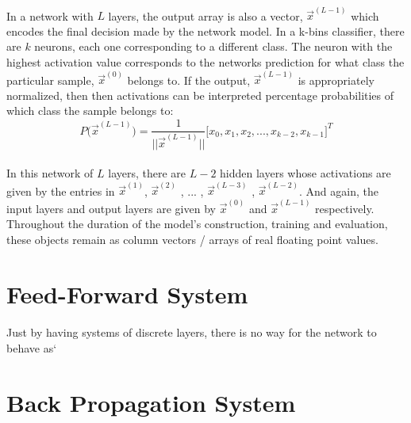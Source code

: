 \documentclass[12pt,letterpaper]{article}
\begin{document}
\paragraph*{}In a network with $L$ layers, the output array is also a vector, 
$\vec{x}^{(L-1)}$ which encodes the final decision made by the network model. In a k-bins classifier, there are $k$ neurons, each one corresponding to a different class. The neuron with the highest activation value corresponds to the networks prediction for what class the particular sample, 
$\vec{x}^{(0)}$ belongs to. If the output, $\vec{x}^{(L-1)}$ is appropriately normalized, then then activations can be interpreted percentage probabilities of which class the sample belongs to:
\begin{equation}
\label{probability}
P \big( \vec{x}^{(L-1)} \big) = \frac{1}{||\vec{x}^{(L-1)}||} \big[ x_0 , x_1 , x_2 , ... , x_{k-2} , x_{k-1} \big]^T
\end{equation}

\paragraph*{}In this network of $L$ layers, there are $L-2$ hidden layers whose activations are given by the entries in $\vec{x}^{(1)}$, 
$\vec{x}^{(2)}$ , ... , $\vec{x}^{(L-3)}$ , $\vec{x}^{(L-2)}$. And again, the input layers and output layers are given by $\vec{x}^{(0)}$ and 
$\vec{x}^{(L-1)}$ respectively. Throughout the duration of the model's construction, training and evaluation, these objects remain as column vectors / arrays of real floating point values.

\pagebreak


\section*{Feed-Forward System}

\paragraph*{}Just by having systems of discrete layers, there is no way for the network to behave as`	


\section*{Back Propagation System}
\end{document}
